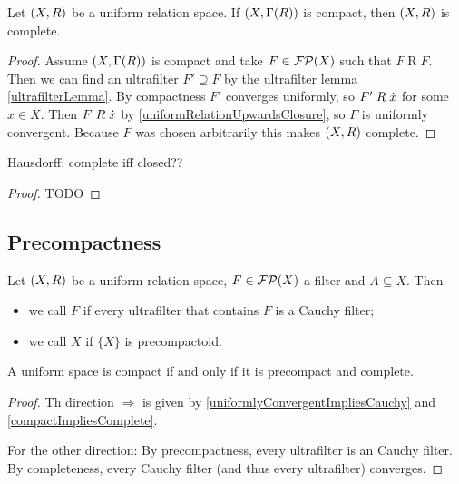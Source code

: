 \begin{proposition} \label{compactImpliesComplete}
Let $\left( X,R \right)$ be a uniform relation space. If $\left( X,\Gamma(R) \right)$ is compact, then $\left( X,R \right)$ is complete.
\end{proposition}
\begin{proof}
Assume $\left( X,\Gamma(R) \right)$ is compact and take $F\in\operatorname{\mathcal{FP}}(X)$ such that $F\mathrel{R}F$. Then we can find an ultrafilter $F'\supseteq F$ by the ultrafilter lemma \ref{ultrafilterLemma}. By compactness $F'$ converges uniformly, so $F'\mathrel{R}\dot{x}$ for some $x\in X$. Then $F \mathrel{R}\dot{x}$ by \ref{uniformRelationUpwardsClosure}, so $F$ is uniformly convergent. Because $F$ was chosen arbitrarily this makes $\left( X,R \right)$ complete.
\end{proof}

\begin{proposition}
Hausdorff: complete iff closed??
\end{proposition}
\begin{proof}
TODO
\end{proof}

\subsection{Precompactness}
\begin{definition}
Let $\left( X,R \right)$ be a uniform relation space, $F\in\operatorname{\mathcal{FP}}(X)$ a filter and $A\subseteq X$.
Then 
\begin{itemize}
\item we call $F$  if every ultrafilter that contains $F$ is a Cauchy filter;
\item we call $X$  if $\{X\}$ is precompactoid.
\end{itemize}
\end{definition}

\begin{proposition}
A uniform space is compact \textup{if and only if} it is precompact and complete.
\end{proposition}
\begin{proof}
Th direction $\Rightarrow$ is given by \ref{uniformlyConvergentImpliesCauchy} and \ref{compactImpliesComplete}.

For the other direction: By precompactness, every ultrafilter is an Cauchy filter. By completeness, every Cauchy filter (and thus every ultrafilter) converges.
\end{proof}

